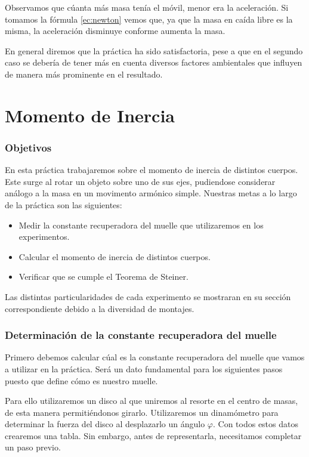 \documentclass[12pt, a4paper, titlepage]{article}
\begin{document}
  Observamos que cúanta más masa tenía el móvil, menor era la aceleración. Si tomamos la fórmula \ref{ec:newton} vemos que, ya que la masa en caída libre es la misma, la aceleración disminuye conforme aumenta la masa.

  En general diremos que la práctica ha sido satisfactoria, pese a que en el segundo caso se debería de tener más en cuenta diversos factores ambientales que influyen de manera más prominente en el resultado.


  \newpage
  \thispagestyle{plain}
  \mbox{}

  \newpage
  \part{Momento de Inercia}

  \section{Objetivos}

  En esta práctica trabajaremos sobre el momento de inercia de distintos cuerpos. Este surge al rotar un objeto sobre uno de sus ejes, pudiendose considerar análogo a la masa en un movimento armónico simple. Nuestras metas a lo largo de la práctica son las siguientes:
  \begin{itemize}[label=$-$]
    \item Medir la constante recuperadora del muelle que utilizaremos en los experimentos.
    \item Calcular el momento de inercia de distintos cuerpos.
    \item Verificar que se cumple el Teorema de Steiner.
  \end{itemize}
  Las distintas particularidades de cada experimento se mostraran en su sección correspondiente debido a la diversidad de montajes.

  \section{Determinación de la constante recuperadora del muelle}

  Primero debemos calcular cúal es la constante recuperadora del muelle que vamos a utilizar en la práctica. Será un dato fundamental para los siguientes pasos puesto que define cómo es nuestro muelle.

  Para ello utilizaremos un disco al que uniremos al resorte en el centro de masas, de esta manera permitiéndonos girarlo. Utilizaremos un dinamómetro para determinar la fuerza del disco al desplazarlo un ángulo $\varphi$. Con todos estos datos crearemos una tabla. Sin embargo, antes de representarla, necesitamos completar un paso previo.
\end{document}
